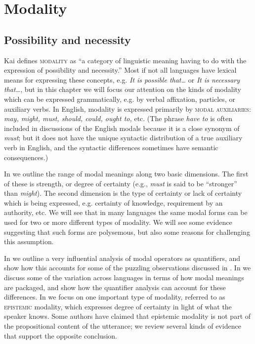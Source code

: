 \chapter{Modality}\label{sec:16}

\section{Possibility and necessity}\label{sec:16.1}

Kai \citet[20]{vonFintel2006} defines \textsc{modality} as “a category of linguistic meaning having to do with the expression of possibility and necessity.” Most if not all languages have lexical means for expressing these concepts, e.g. \textit{It is possible that…} or \textit{It is necessary} \textit{that…}, but in this chapter we will focus our attention on the kinds of modality which can be expressed grammatically, e.g. by verbal affixation, particles, or auxiliary verbs. In English, modality is expressed primarily by \textsc{modal auxiliaries}: \textit{may, might, must, should, could, ought to,} etc. (The phrase \textit{have to} is often included in discussions of the English modals because it is a close synonym of \textit{must}; but it does not have the unique syntactic distribution of a true auxiliary verb in English, and the syntactic differences sometimes have semantic consequences.)



In  we outline the range of modal meanings along two basic dimensions. The first of these is strength, or degree of certainty (e.g., \textit{must} is said to be “stronger” than \textit{might}). The second dimension is the type of certainty or lack of certainty which is being expressed, e.g. certainty of knowledge, requirement by an authority, etc. We will see that in many languages the same modal forms can be used for two or more different types of modality. We will see some evidence suggesting that such forms are polysemous, but also some reasons for challenging this assumption.



In  we outline a very influential analysis of modal operators as quantifiers, and show how this accounts for some of the puzzling observations discussed in . In  we discuss some of the variation across languages in terms of how modal meanings are packaged, and show how the quantifier analysis can account for these differences. In  we focus on one important type of modality, referred to as \textsc{epistemic} modality, which expresses degree of certainty in light of what the speaker knows. Some authors have claimed that epistemic modality is not part of the propositional content of the utterance; we review several kinds of evidence that support the opposite conclusion.


